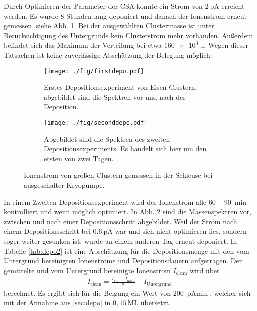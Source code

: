 Durch Optimieren der Parameter der CSA konnte ein Strom von $\SI{2}{\pA}$ erreicht werden.
Es wurde 8 Stunden lang deponiert und danach der Ionenstrom erneut gemessen, siehe Abb. \ref{fig:firstdepo}.
Bei der ausgewählten Clustermasse ist unter Berücksichtigung des Untergrunds kein Clusterstrom mehr vorhanden. 
Außerdem befindet sich das Maximum der Verteilung bei etwa $\SI{160e3}{\amu}$.
Wegen dieser Tatsachen ist keine zuverlässige Abschätzung der Belegung möglich.\\
\begin{figure}[h]
  \begin{subfigure}[h]{\textwidth}
    \texttt{[image: ./fig/firstdepo.pdf]}
    \caption{Erstes Depositionsexperiment von Eisen Clustern, abgebildet sind die Spektren vor und nach der Deposition.}
    \label{fig:firstdepo}
  \end{subfigure}\hfill
  \begin{subfigure}[t]{\textwidth}
    \texttt{[image: ./fig/seconddepo.pdf]}
    \caption{Abgebildet sind die Spektren des zweiten Depositionsexperiments. Es handelt sich hier um den ersten von zwei Tagen.}
    \label{fig:seconddepo}
  \end{subfigure}
  \caption{Ionenstrom von großen Clustern gemessen in der Schleuse bei ausgeschalter Kryopumpe.} 
  \label{fig:deposition}
\end{figure}

In einem Zweiten Depositionsexperiment wird der Ionenstrom alle $60 - \SI{90}{\min}$ kontrolliert und wenn möglich optimiert.
In Abb. \ref{fig:seconddepo} sind die Massenspektren vor, zwischen und nach einer Depositionsschritt abgebildet. 
Weil der Strom nach einem Depositionsschritt bei $\SI{0.6}{\pA}$ war und sich nicht optimieren lies, sondern soger weiter gesunken ist, wurde an einem anderen Tag erneut deponiert.
In Tabelle \ref{tab:depo2} ist eine Abschätzung für die Depositionsmenge mit den vom Untergrund bereinigten Ionenströme und Depositionsdauern aufgetragen. Der gemittelte und vom Untergrund bereinigte Ionenstrom $I_{\text{clean}}$ wird über
\begin{align*}
  I_{\text{clean}}=\frac{I_{\text{vor}}+I_{\text{nach}}}{2}-I_{\text{Untergrund}}
\end{align*} 
berechnet. Es ergibt sich für die Belgung ein Wert von $\SI{200}{\pA\min}$, welcher sich mit der Annahme aus \ref{sec:depo} in $0,15\,$ML übersetzt.

